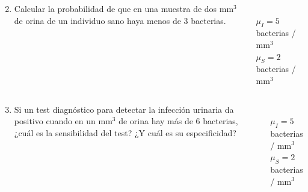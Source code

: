 \documentclass[aspectratio=149,10pt,xcolor=dvipsnames,t]{beamer}
\begin{document}
	
\begin{frame}
\begin{columns}
\begin{column}[T]{0.7\textwidth}
\begin{enumerate}
\setcounter{enumi}{1}
\item Calcular la probabilidad de que en una muestra de dos mm$^3$ de orina de un individuo sano haya menos de 3 bacterias. 
\end{enumerate}
\end{column}
\begin{column}[T]{0.3\textwidth}
\\
$\mu_I = 5$ bacterias / mm$^3$\\
$\mu_S = 2$ bacterias / mm$^3$\\
\end{column}
\end{columns} 
\end{frame}	
	
	
\begin{frame}
\begin{columns}
\begin{column}[T]{0.7\textwidth}
\begin{enumerate}
\setcounter{enumi}{2}
\item Si un test diagnóstico para detectar la infección urinaria da positivo cuando en un mm$^3$ de orina hay más de 6 bacterias,
¿cuál es la sensibilidad del test? ¿Y cuál es su especificidad?
\end{enumerate}
\end{column}
\begin{column}[T]{0.3\textwidth}
\\
$\mu_I = 5$ bacterias / mm$^3$\\
$\mu_S = 2$ bacterias / mm$^3$\\
\end{column}
\end{columns} 
\end{frame}	
	
\end{document}
